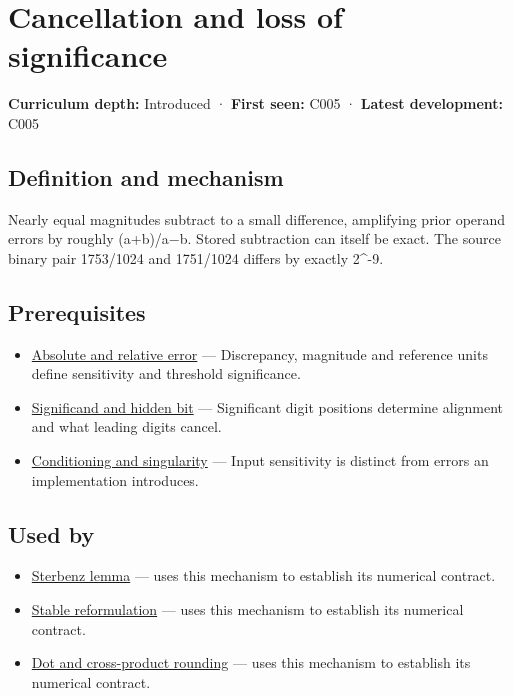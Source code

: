 \hypertarget{appendix-a2773a6a2f9d}{}
\section{Cancellation and loss of significance}\label{appendix-a2773a6a2f9d-cancellation-and-loss-of-significance}

\textbf{Curriculum depth:} Introduced · \textbf{First seen:} C005 · \textbf{Latest development:} C005

\subsection{Definition and mechanism}\label{appendix-a2773a6a2f9d-definition-and-mechanism}

Nearly equal magnitudes subtract to a small difference, amplifying prior operand errors by roughly (\textbar a\textbar+\textbar b\textbar)/\textbar a−b\textbar. Stored subtraction can itself be exact. The source binary pair 1753/1024 and 1751/1024 differs by exactly 2\^{}-9.

\subsection{Prerequisites}\label{appendix-a2773a6a2f9d-prerequisites}

\begin{itemize}
\tightlist
\item
  \hyperref[appendix-3ae74e89b4e6]{Absolute and relative error} --- Discrepancy, magnitude and reference units define sensitivity and threshold significance.
\item
  \hyperref[appendix-a24fd710cf67]{Significand and hidden bit} --- Significant digit positions determine alignment and what leading digits cancel.
\item
  \hyperref[appendix-8f6a01f284a7]{Conditioning and singularity} --- Input sensitivity is distinct from errors an implementation introduces.
\end{itemize}

\subsection{Used by}\label{appendix-a2773a6a2f9d-used-by}

\begin{itemize}
\tightlist
\item
  \hyperref[appendix-399b7ad53f39]{Sterbenz lemma} --- uses this mechanism to establish its numerical contract.
\item
  \hyperref[appendix-d7f8ba961670]{Stable reformulation} --- uses this mechanism to establish its numerical contract.
\item
  \hyperref[appendix-5aef4f13483a]{Dot and cross-product rounding} --- uses this mechanism to establish its numerical contract.
\end{itemize}

